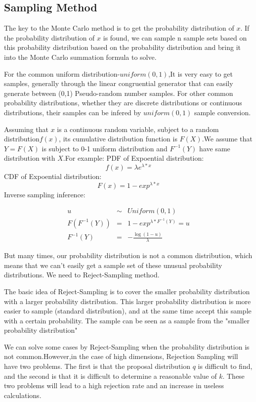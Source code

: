 \subsection{Sampling Method}
The key to the Monte Carlo method is to get the probability distribution of $x$. If the probability distribution of $x$ is found, we can sample n sample sets based on this probability distribution based on the probability distribution and bring it into the Monte Carlo summation formula to solve.

For the common uniform distribution-$uniform (0,1)$,It  is very easy to get samples, generally through the linear congruential generator that can easily generate between (0,1) Pseudo-random number samples. For other common probability distributions, whether they are discrete distributions or continuous distributions, their samples can be infered by $uniform (0,1)$ sample conversion.

Assuming that $x$ is a continuous random variable, subject to a random distribution$f(x)$, its cumulative distribution function is $F(X)$.We assume that $Y = F(X)$ is subject to 0-1 uniform distribution and $F^{-1}(Y)$ have same distribution with $X$.For example:
PDF of Expoential distribution:
\[
  f(x) = \lambda e^{\lambda*x}
\]
CDF of Expoential distribution:
\[
  F(x) = 1- exp^{\lambda*x}
\]
Inverse sampling inference:

\begin{eqnarray*}
u & \sim & Uniform(0,1) \\
F(F^{-1}(Y)) &=& 1- exp^{\lambda*F^{-1}(Y)} = u \\
F^{-1}(Y) &=&-\frac{\log(1-u)}{\lambda}
\end{eqnarray*}

But many times, our probability distribution is not a common distribution, which means that we can't easily get a sample set of these unusual probability distributions. We need to Reject-Sampling method.

The basic idea of Reject-Sampling is to cover the smaller probability distribution with a larger probability distribution. This larger probability distribution is more easier to sample (standard distribution), and at the same time accept this  sample with a certain probability. The sample can be seen as a sample from the "smaller probability distribution"


We can solve some cases  by Reject-Sampling when the probability distribution is not common.However,in the case of high dimensions, Rejection Sampling will have two problems. The first is that the proposal  distribution $q$ is difficult to find, and the second is that it is difficult to determine a reasonable value of $k$. These two problems will lead to a high rejection rate and an increase in useless calculations.


